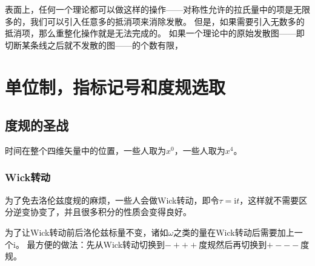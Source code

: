 \documentclass[hyperref, UTF8, a4paper]{ctexart}
\newcommand*{\ii}{\mathrm{i}}
\begin{document}
表面上，任何一个理论都可以做这样的操作——对称性允许的拉氏量中的项是无限多的，我们可以引入任意多的抵消项来消除发散。
但是，如果需要引入无数多的抵消项，那么重整化操作就是无法完成的。
如果一个理论中的原始发散图——即切断某条线之后就不发散的图——的个数有限，

\section{单位制，指标记号和度规选取}

\subsection{度规的圣战}

时间在整个四维矢量中的位置，一些人取为$x^0$，一些人取为$x^4$。

\subsubsection{Wick转动}

为了免去洛伦兹度规的麻烦，一些人会做Wick转动，即令$\tau=\ii t$，这样就不需要区分逆变协变了，并且很多积分的性质会变得良好。

为了让Wick转动前后洛伦兹标量不变，诸如$\omega$之类的量在Wick转动后需要加上一个$\ii$。
最方便的做法：先从Wick转动切换到$-+++$度规然后再切换到$+---$度规。
\end{document}
